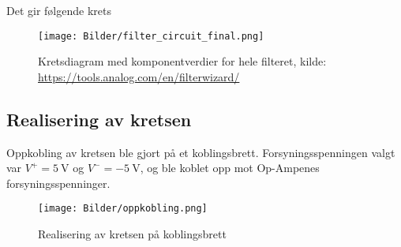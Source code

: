 Det gir følgende krets
\begin{figure}[H]
    \centering
    \texttt{[image: Bilder/filter\_circuit\_final.png]}
    \caption{Kretsdiagram med komponentverdier for hele filteret, kilde: \url{https://tools.analog.com/en/filterwizard/}}
    \label{fig:filter-circuit-final}
\end{figure}

\subsection{Realisering av kretsen}
Oppkobling av kretsen ble gjort på et koblingsbrett. Forsyningsspenningen valgt var $V^+ = \SI{5}{\volt}$ og 
$V^- = \SI{-5}{\volt}$, og ble koblet opp mot Op-Ampenes forsyningsspenninger.
\begin{figure}[H]
    \centering
    \texttt{[image: Bilder/oppkobling.png]}
    \caption{Realisering av kretsen på koblingsbrett}
    \label{fig:realisering-img}
\end{figure}
